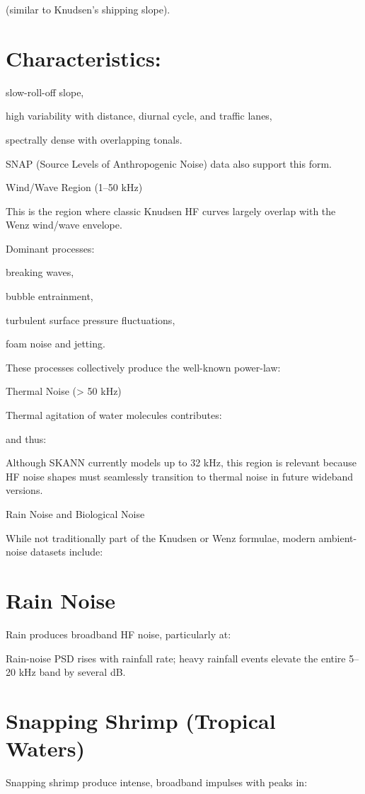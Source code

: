 \documentclass[12pt]{article}
\begin{document}
(similar to Knudsen’s shipping slope).

\section*{Characteristics:}
slow-roll-off slope,

high variability with distance, diurnal cycle, and traffic lanes,

spectrally dense with overlapping tonals.

SNAP (Source Levels of Anthropogenic Noise) data also support this form.

Wind/Wave Region (1–50 kHz)

This is the region where classic Knudsen HF curves largely overlap with the Wenz wind/wave envelope.

Dominant processes:

breaking waves,

bubble entrainment,

turbulent surface pressure fluctuations,

foam noise and jetting.

These processes collectively produce the well-known power-law:


Thermal Noise (> 50 kHz)

Thermal agitation of water molecules contributes:


and thus:


Although SKANN currently models up to 32 kHz, this region is relevant because HF noise shapes must seamlessly transition to thermal noise in future wideband versions.

Rain Noise and Biological Noise

While not traditionally part of the Knudsen or Wenz formulae, modern ambient-noise datasets include:

\section*{Rain Noise}
Rain produces broadband HF noise, particularly at:


Rain-noise PSD rises with rainfall rate; heavy rainfall events elevate the entire 5–20 kHz band by several dB.

\section*{Snapping Shrimp (Tropical Waters)}
Snapping shrimp produce intense, broadband impulses with peaks in:
\end{document}
